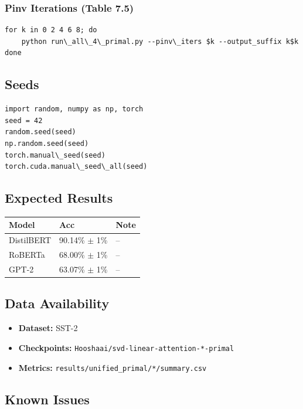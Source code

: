 \subsubsection{Pinv Iterations (Table 7.5)}
\begin{lstlisting}
for k in 0 2 4 6 8; do
    python run\_all\_4\_primal.py --pinv\_iters $k --output_suffix k$k
done
\end{lstlisting}

\subsection{Seeds}

\begin{lstlisting}
import random, numpy as np, torch
seed = 42
random.seed(seed)
np.random.seed(seed)
torch.manual\_seed(seed)
torch.cuda.manual\_seed\_all(seed)
\end{lstlisting}

\subsection{Expected Results}

\begin{table}[H]
\centering
\small
\begin{tabular}{lll}
\toprule
\textbf{Model} & \textbf{Acc} & \textbf{Note} \\
\midrule
DistilBERT & 90.14\% $\pm$ 1\% & -- \\
RoBERTa & 68.00\% $\pm$ 1\% & -- \\
GPT-2 & 63.07\% $\pm$ 1\% & -- \\
\bottomrule
\end{tabular}
\end{table}

\subsection{Data Availability}

\begin{itemize}
\item \textbf{Dataset:} SST-2
\item \textbf{Checkpoints:} \texttt{Hooshaai/svd-linear-attention-*-primal}
\item \textbf{Metrics:} \texttt{results/unified\_primal/*/summary.csv}

\end{itemize}
\subsection{Known Issues}

